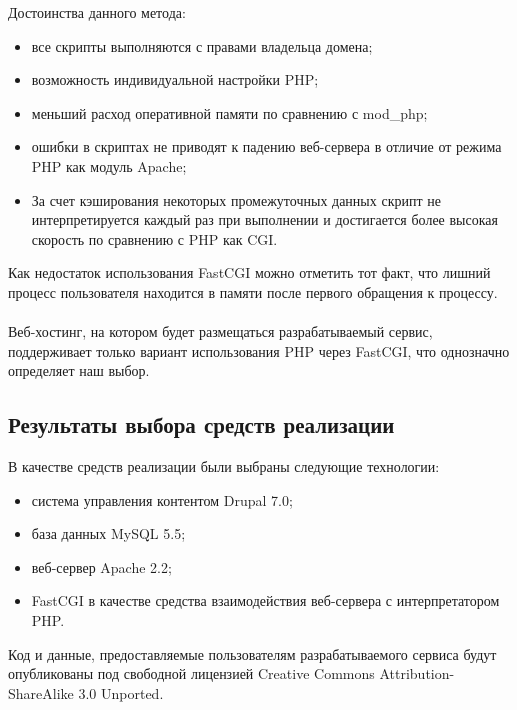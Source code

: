 Достоинства данного метода:
\begin{itemize}
\item
  все скрипты выполняются с правами владельца домена;
\item
  возможность индивидуальной настройки PHP;
\item
  меньший расход оперативной памяти по сравнению с mod\_php;
\item
  ошибки в скриптах не приводят к падению веб-сервера в отличие от режима PHP как модуль Apache;
\item
  За счет кэширования некоторых промежуточных данных скрипт не интерпретируется каждый раз при выполнении
  и достигается более высокая скорость по сравнению с PHP как CGI.
\end{itemize}

Как недостаток использования FastCGI можно отметить тот факт,
что лишний процесс пользователя находится в памяти после первого обращения
к процессу.

\paragraph{}
Веб-хостинг, на котором будет размещаться разрабатываемый сервис, поддерживает только вариант использования PHP через FastCGI,
что однозначно определяет наш выбор.

\subsection{Результаты выбора средств реализации}
\label{ssec:choice_results}

В качестве средств реализации были выбраны следующие технологии:
\begin{itemize}
\item система управления контентом Drupal 7.0;
\item база данных MySQL 5.5;
\item веб-сервер Apache 2.2;
\item FastCGI в качестве средства взаимодействия веб-сервера
  с интерпретатором PHP.

\end{itemize}

Код и данные, предоставляемые пользователям разрабатываемого сервиса
будут опубликованы под свободной лицензией
Creative Commons Attribution-ShareAlike 3.0 Unported.